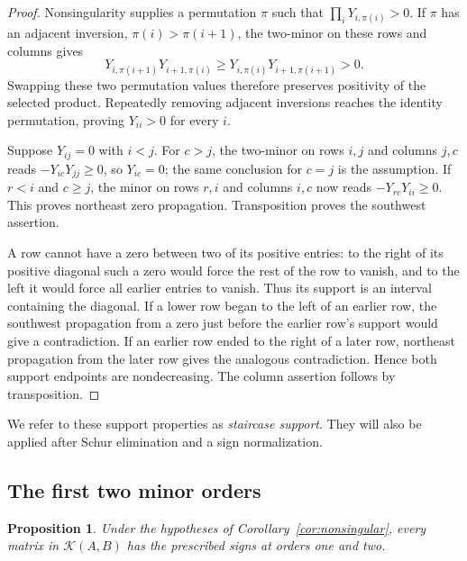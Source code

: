 \documentclass[10pt,a4paper]{article}
\newtheorem{proposition}[theorem]{Proposition}
\theoremstyle{definition}
\theoremstyle{remark}
\numberwithin{equation}{section}
\newcommand{\K}{\mathcal K}
\begin{document}
\begin{proof}
Nonsingularity supplies a permutation $\pi$ such that
$\prod_iY_{i,\pi(i)}>0$. If $\pi$ has an adjacent inversion,
$\pi(i)>\pi(i+1)$, the two-minor on these rows and columns gives
\[
 Y_{i,\pi(i+1)}Y_{i+1,\pi(i)}
 \geq Y_{i,\pi(i)}Y_{i+1,\pi(i+1)}>0.
\]
Swapping these two permutation values therefore preserves positivity
of the selected product. Repeatedly removing adjacent inversions
reaches the identity permutation, proving $Y_{ii}>0$ for every $i$.

Suppose $Y_{ij}=0$ with $i<j$. For $c>j$, the two-minor on rows
$i,j$ and columns $j,c$ reads
$-Y_{ic}Y_{jj}\geq0$, so $Y_{ic}=0$; the same conclusion for
$c=j$ is the assumption. If $r<i$ and $c\geq j$, the minor on
rows $r,i$ and columns $i,c$ now reads
$-Y_{rc}Y_{ii}\geq0$. This proves northeast zero propagation.
Transposition proves the southwest assertion.

A row cannot have a zero between two of its positive entries: to the
right of its positive diagonal such a zero would force the rest of the
row to vanish, and to the left it would force all earlier entries to
vanish. Thus its support is an interval containing the diagonal.
If a lower row began to the left of an earlier row, the southwest
propagation from a zero just before the earlier row's support would
give a contradiction. If an earlier row ended to the right of a later
row, northeast propagation from the later row gives the analogous
contradiction. Hence both support endpoints are nondecreasing.
The column assertion follows by transposition.
\end{proof}

We refer to these support properties as \emph{staircase support}.
They will also be applied after Schur elimination and a sign
normalization.

\subsection{The first two minor orders}

\begin{proposition}\label{prop:ordertwo}
Under the hypotheses of Corollary~\ref{cor:nonsingular}, every matrix
in $\K(A,B)$ has the prescribed signs at orders one and two.
\end{proposition}
\end{document}
